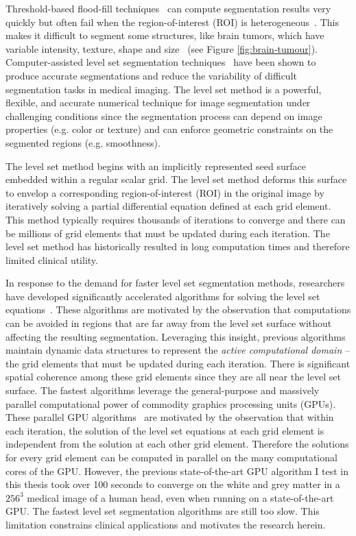 Threshold-based flood-fill techniques~\cite{Chen-2008} can compute  segmentation results very quickly but often fail when the region-of-interest (ROI) is heterogeneous~\cite{Unger-2008}. This makes it difficult to segment some  structures, like brain tumors, which have variable intensity, texture, shape and size~\cite{Chen-2008} (see Figure \ref{fig:brain-tumour}). Computer-assisted level set segmentation techniques~\cite{Lefohn-2003-MICCAI,Cates-2004} have been shown to produce accurate segmentations and reduce the variability of difficult segmentation tasks in medical imaging. The level set method is a powerful, flexible, and accurate numerical technique for image segmentation under challenging conditions since the segmentation process can depend on image properties (e.g. color or texture) and can enforce geometric constraints on the segmented regions (e.g. smoothness).

The level set method begins with an implicitly represented seed surface embedded within a regular scalar grid. The level set method deforms this surface to envelop a corresponding region-of-interest (ROI) in the original image by iteratively solving a partial differential equation defined at each grid element. This method typically requires thousands of iterations to converge and there can be millions of grid elements that must be updated during each iteration. The level set method has historically resulted in long computation times and therefore limited clinical utility.

In response to the demand for faster level set segmentation methods, researchers have developed significantly accelerated algorithms for solving the level set equations~\cite{Whitaker-1994, Adalsteinsson-1995,Peng-1999,Lefohn-2003-Vis,Lefohn-2003-MICCAI,Lefohn-2004,Cates-2004,Jeong-2009}. These algorithms are motivated by the observation that computations can be avoided in regions that are far away from the level set surface without affecting the resulting segmentation. Leveraging this insight, previous algorithms maintain dynamic data structures to represent the \emph{active computational domain} -- the grid elements that must be updated during each iteration. There is significant spatial coherence among these grid elements since they are all near the level set surface.
The fastest algorithms leverage the general-purpose and massively parallel computational power of commodity graphics processing units (GPUs). These parallel GPU algorithms~\cite{Lefohn-2003-Vis,Lefohn-2003-MICCAI,Lefohn-2004,Cates-2004,Jeong-2009} are motivated by the observation that within each iteration, the solution of the level set equations at each grid element is independent from the solution at each other grid element. Therefore the solutions for every grid element can be computed in parallel on the many computational cores of the GPU. However, the previous state-of-the-art GPU algorithm I test in this thesis took over 100 seconds  to converge  on  the  white and grey matter in a $256^3$ medical image of a human head, even when running on a state-of-the-art GPU. The fastest level set segmentation algorithms are still too slow. This limitation constrains clinical applications and motivates the research herein.

